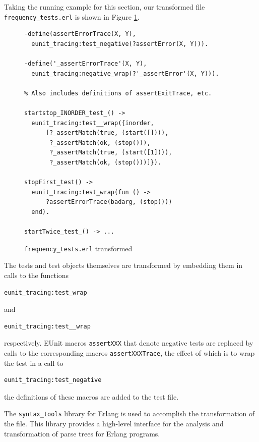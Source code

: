 \documentclass[]{sigplanconf}
\begin{document}
Taking the running example for this section, our transformed file \texttt{frequency\_tests.erl} is shown in Figure \ref{transformed}.
\begin{figure}
\begin{verbatim}
-define(assertErrorTrace(X, Y),
  eunit_tracing:test_negative(?assertError(X, Y))).

-define('_assertErrorTrace'(X, Y),
  eunit_tracing:negative_wrap(?'_assertError'(X, Y))).
	
% Also includes definitions of assertExitTrace, etc.

startstop_INORDER_test_() ->
  eunit_tracing:test__wrap({inorder,
      [?_assertMatch(true, (start([]))),
       ?_assertMatch(ok, (stop())),
       ?_assertMatch(true, (start([1]))),
       ?_assertMatch(ok, (stop()))]}).

stopFirst_test() ->
  eunit_tracing:test_wrap(fun () ->
      ?assertErrorTrace(badarg, (stop()))
  end).

startTwice_test_() -> ...
\end{verbatim}
\caption{\texttt{frequency\_tests.erl} transformed}
\label{transformed}
\end{figure}
The tests and test objects themselves are transformed by embedding them in calls to the functions 
\begin{verbatim}
eunit_tracing:test_wrap 
\end{verbatim}
and  
\begin{verbatim}
eunit_tracing:test__wrap
\end{verbatim}
respectively. EUnit macros \texttt{assertXXX} that denote negative tests are replaced by calls to the corresponding macros \texttt{assertXXXTrace}, the effect of which is to wrap the test in a call to 
\begin{verbatim}
eunit_tracing:test_negative
\end{verbatim}
the definitions of these macros are added to the test file.  

The \texttt{syntax\_tools} library for Erlang is used to accomplish the transformation of the file. This library provides a high-level interface for the analysis and transformation of parse trees for Erlang programs. 
\end{document}
